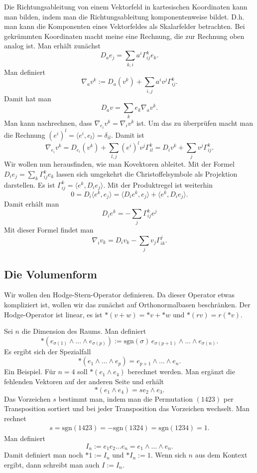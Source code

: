 \documentclass[a4paper,10pt,fleqn,twocolumn,twoside]{article}
\begin{document}
Die Richtungsableitung von einem Vektorfeld in kartesischen
Koordinaten kann man bilden, indem man die Richtungsableitung
komponentenweise bildet. D.h. man kann die Komponenten eines
Vektorfeldes als Skalarfelder betrachten. Bei gekrümmten Koordinaten
macht meine eine Rechnung, die zur Rechnung oben analog ist.
Man erhält zunächst
\[D_a e_j = \sum_{k,i}a^i \Gamma_{ij}^k e_k.\]
Man definiert
\[\nabla_a v^k := D_a(v^k) + \sum_{i,j}a^i v^j \Gamma_{ij}^k.\]
Damit hat man
\[D_a v = \sum_k e_k \nabla_a v^k.\]
%
Man kann nachrechnen, dass \(\nabla_{e_i}v^k=\nabla_i v^k\) ist.
Um das zu überprüfen macht man die Rechnung
\((e^i)^l = \langle e^i,e_l\rangle = \delta_{il}.\)
Damit ist
\[\nabla_{e_i} v^k = D_{e_i}(v^k)
+ \sum_{l,j}(e^i)^l v^j \Gamma_{il}^k
= D_i v^k + \sum_{j} v^j\Gamma_{ij}^k.\]
Wir wollen nun herausfinden, wie man Kovektoren ableitet.
Mit der Formel \(D_ie_j=\sum_k\Gamma_{ij}^k e_k\) lassen sich
umgekehrt die Christoffelsymbole als Projektion darstellen. Es ist
\(\Gamma_{ij}^k = \langle e^k,D_ie_j\rangle.\)
Mit der Produktregel ist weiterhin
\[0=D_i\langle e^k,e_j\rangle
= \langle D_ie^k,e_j\rangle + \langle e^k,D_ie_j\rangle.\]
Damit erhält man
\[D_ie^k = -\sum_{j}\Gamma_{ij}^ke^j\]
Mit dieser Formel findet man
\[\nabla_i v_k = D_iv_k-\sum_{j}v_j\Gamma_{ik}^j.\]

\subsection{Die Volumenform}

Wir wollen den Hodge-Stern-Operator definieren. Da dieser Operator
etwas kompliziert ist, wollen wir das zunächst auf Orthonormalbasen
beschränken. Der Hodge-Operator ist linear, es ist
\(*(v+w) = *v+*w\) und \(*(rv)=r(*v)\).

Sei \(n\) die Dimension des Raums. Man definiert
\[*(e_{\sigma(1)}\wedge\ldots\wedge e_{\sigma(p)})
:= \mathrm{sgn}(\sigma)\,e_{\sigma(p+1)}\wedge\ldots\wedge e_{\sigma(n)}.\]
Es ergibt sich der Spezialfall
\[*(e_1\wedge\ldots\wedge e_p) = e_{p+1}\wedge\ldots\wedge e_n.\]
Ein Beispiel. Für \(n=4\) soll \(*(e_1\wedge e_4)\)
berechnet werden. Man ergänzt die fehlenden Vektoren
auf der anderen Seite und erhält
\[*(e_1\wedge e_4) = se_2\wedge e_3.\]
Das Vorzeichen \(s\) bestimmt man, indem man die Permutation
\((1423)\) per Transposition sortiert und bei jeder Transposition
das Vorzeichen wechselt. Man rechnet
\begin{gather*}
s = \mathrm{sgn}(1423)=-\mathrm{sgn}(1324) = \mathrm{sgn}(1234) = 1.
\end{gather*}
Man definiert
\[I_n := e_1e_2\ldots e_n = e_1\wedge\ldots\wedge e_n.\]
Damit definiert man noch \(*1:=I_n\) und \(*I_n:=1\).
Wenn sich \(n\) aus dem Kontext ergibt, dann schreibt man auch \(I:=I_n\).
\end{document}
